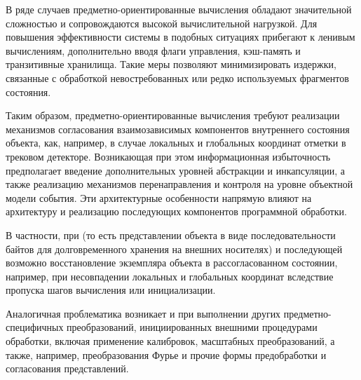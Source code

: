 В ряде случаев предметно-ориентированные вычисления обладают значительной
сложностью и сопровождаются высокой вычислительной нагрузкой. Для повышения
эффективности системы в подобных ситуациях прибегают к ленивым вычислениям,
дополнительно вводя флаги управления, кэш-память и транзитивные хранилища.
Такие меры позволяют минимизировать издержки, связанные с обработкой
невостребованных или редко используемых фрагментов состояния.

Таким образом, предметно-ориентированные вычисления требуют реализации
механизмов согласования взаимозависимых компонентов внутреннего состояния
объекта, как, например, в случае локальных и глобальных координат
отметки в трековом детекторе. Возникающая при этом информационная избыточность
предполагает введение дополнительных уровней абстракции и инкапсуляции,
а также реализацию механизмов перенаправления и контроля на уровне
объектной модели события. Эти архитектурные особенности напрямую влияют
на архитектуру и реализацию последующих компонентов программной обработки.

В частности, при  (то есть представлении объекта в виде
последовательности байтов для долговременного хранения на внешних носителях)
и последующей  возможно восстановление экземпляра объекта
в рассогласованном состоянии, например, при несовпадении локальных и
глобальных координат вследствие пропуска шагов вычисления или инициализации.

Аналогичная проблематика возникает и при выполнении других
предметно-специфичных преобразований, инициированных внешними процедурами
обработки, включая применение калибровок, масштабных преобразований,
а также, например, преобразования Фурье и прочие формы предобработки и
согласования представлений.

